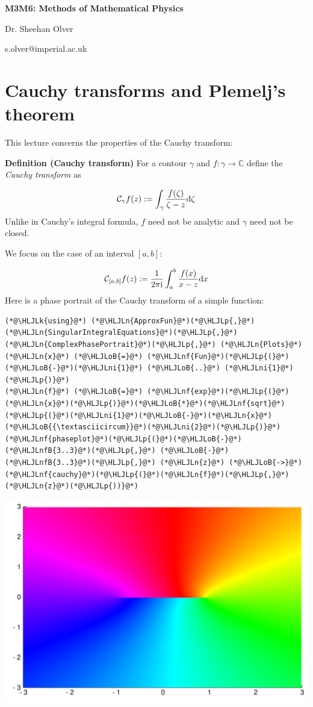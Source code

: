 \documentclass[12pt,a4paper]{article}
\newcommand{\HLJLk}[1]{\textcolor[RGB]{148,91,176}{\textbf{#1}}}
\newcommand{\HLJLn}[1]{#1}
\newcommand{\HLJLnf}[1]{\textcolor[RGB]{66,102,213}{#1}}
\newcommand{\HLJLnfB}[1]{\textcolor[RGB]{59,151,46}{#1}}
\newcommand{\HLJLni}[1]{\textcolor[RGB]{59,151,46}{#1}}
\newcommand{\HLJLoB}[1]{\textcolor[RGB]{102,102,102}{\textbf{#1}}}
\newcommand{\HLJLp}[1]{#1}
\def\D{ {\rm d} }
\def\I{ {\rm i} }
\def\C{ {\mathbb C} }
\def\CC{ {\cal C} }
\def\dx{\D x}
\begin{document}
\textbf{M3M6: Methods of Mathematical Physics}

Dr. Sheehan Olver

s.olver@imperial.ac.uk

\section{Cauchy transforms and Plemelj's theorem}
This lecture concerns the properties of the Cauchy transform:

\textbf{Definition (Cauchy transform)} For a contour $\gamma$ and $f : \gamma \rightarrow \C$ define the \emph{Cauchy transform} as

\[
\CC_\gamma f(z) := \int_\gamma {f(\zeta) \over \zeta - z} \D \zeta
\]
Unlike in Cauchy's integral formula, $f$ need not be analytic and $\gamma$ need not be closed.

We focus on the case of an interval $[a,b]$:

\[
\CC_{[a,b]} f(z) := {1 \over 2 \pi \I} \int_a^b {f(x) \over x - z} \dx
\]
Here is a phase portrait of the Cauchy transform of a simple function:


\begin{lstlisting}
(*@\HLJLk{using}@*) (*@\HLJLn{ApproxFun}@*)(*@\HLJLp{,}@*) (*@\HLJLn{SingularIntegralEquations}@*)(*@\HLJLp{,}@*) (*@\HLJLn{ComplexPhasePortrait}@*)(*@\HLJLp{,}@*) (*@\HLJLn{Plots}@*)
(*@\HLJLn{x}@*) (*@\HLJLoB{=}@*) (*@\HLJLnf{Fun}@*)(*@\HLJLp{(}@*)(*@\HLJLoB{-}@*)(*@\HLJLni{1}@*) (*@\HLJLoB{..}@*) (*@\HLJLni{1}@*)(*@\HLJLp{)}@*)
(*@\HLJLn{f}@*) (*@\HLJLoB{=}@*) (*@\HLJLnf{exp}@*)(*@\HLJLp{(}@*)(*@\HLJLn{x}@*)(*@\HLJLp{)}@*)(*@\HLJLoB{*}@*)(*@\HLJLnf{sqrt}@*)(*@\HLJLp{(}@*)(*@\HLJLni{1}@*)(*@\HLJLoB{-}@*)(*@\HLJLn{x}@*)(*@\HLJLoB{{\textasciicircum}}@*)(*@\HLJLni{2}@*)(*@\HLJLp{)}@*)
(*@\HLJLnf{phaseplot}@*)(*@\HLJLp{(}@*)(*@\HLJLoB{-}@*)(*@\HLJLnfB{3..3}@*)(*@\HLJLp{,}@*) (*@\HLJLoB{-}@*)(*@\HLJLnfB{3..3}@*)(*@\HLJLp{,}@*) (*@\HLJLn{z}@*) (*@\HLJLoB{->}@*) (*@\HLJLnf{cauchy}@*)(*@\HLJLp{(}@*)(*@\HLJLn{f}@*)(*@\HLJLp{,}@*)(*@\HLJLn{z}@*)(*@\HLJLp{))}@*)
\end{lstlisting}

\includegraphics[width=\linewidth]{figures/Lecture12_1_1.pdf}
\end{document}
